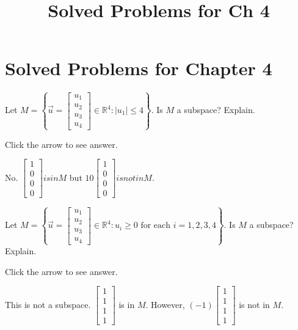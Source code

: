 \documentclass{ximera}
\title{Solved Problems for Ch 4} \license{CC BY-NC-SA 4.0}
\begin{document}
\begin{abstract}
\end{abstract}
\maketitle

\section*{Solved Problems for Chapter 4}

\begin{problem}\label{prb:5.10} Let $M=\left\{ \vec{u}=\left[ \begin{array}{c}
u_{1} \\
u_{2} \\
u_{3} \\
u_{4}
\end{array}\right] \in
\mathbb{R}^{4}:|u_{1}| \leq 4\right\} .$ Is $M$ a
subspace? Explain.

Click the arrow to see answer.  
\begin{expandable}
No. $\left[
\begin{array}{r}
1 \\
0 \\
0 \\
0
\end{array}
\right] is in M$ but $10\left[ \begin{array}{r}
1 \\
0 \\
0 \\
0
\end{array}
\right] is not in M.$
\end{expandable}
\end{problem}

\begin{problem}\label{prb:5.11} Let $M=\left\{ \vec{u}=\left[ \begin{array}{c}
u_{1} \\
u_{2} \\
u_{3} \\
u_{4}
\end{array}\right] \in
\mathbb{R}^{4}:u_{i}\geq 0\text{ for each }i=1,2,3,4\right\} .$ Is $M$ a
subspace? Explain.

Click the arrow to see answer.  
\begin{expandable}
This is not a subspace. $\left[ \begin{array}{r}
1 \\
1 \\
1 \\
1
\end{array}
\right] $
is in $M$. However, $\left( -1\right) \left[
\begin{array}{r}
1 \\
1 \\
1 \\
1
\end{array}
\right] $ is not in $M$.
\end{expandable}
\end{problem}
\end{document}
